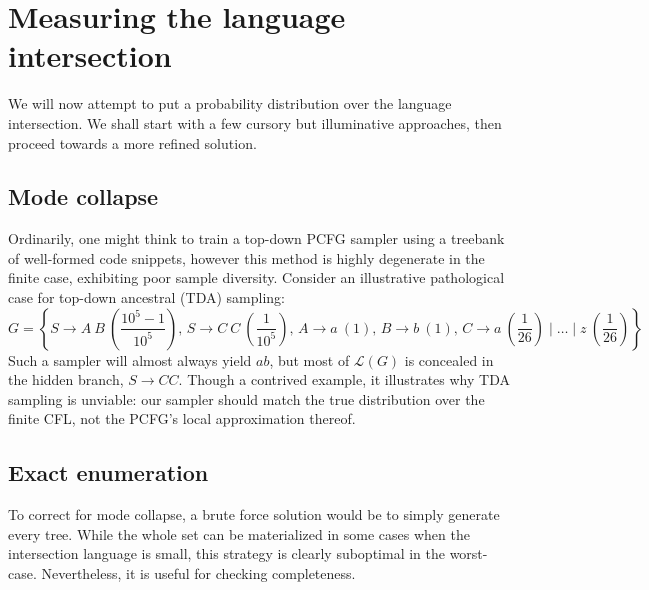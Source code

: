 \documentclass[sigplan,acmsmall,nonacm,screen]{acmart}\settopmatter{printfolios=false,printccs=false,printacmref=false}
\begin{document}
\clearpage

\section{Measuring the language intersection}\label{sec:measurement}

We will now attempt to put a probability distribution over the language intersection. We shall start with a few cursory but illuminative approaches, then proceed towards a more refined solution.

\subsection{Mode collapse}

Ordinarily, one might think to train a top-down PCFG sampler using a treebank of well-formed code snippets, however this method is highly degenerate in the finite case, exhibiting poor sample diversity. Consider an illustrative pathological case for top-down ancestral (TDA) sampling:
$$
G=\left\{ S \rightarrow A\:B \: \left(\frac{10^5 - 1}{10^5}\right), \hspace{2pt}
     S \rightarrow C\:C \: \left(\frac{1}{10^5}\right), \hspace{2pt}
     A \rightarrow a \: (1), \hspace{2pt}
     B  \rightarrow b \: (1), \hspace{2pt}
     C  \rightarrow a \: \left(\frac{1}{26}\right) \mid \ldots \mid z \: \left(\frac{1}{26}\right)\right\}
$$
Such a sampler will almost always yield $a b$, but most of $\mathcal{L}(G)$ is concealed in the hidden branch, $S \rightarrow C C$. Though a contrived example, it illustrates why TDA sampling is unviable: our sampler should match the true distribution over the finite CFL, not the PCFG's local approximation thereof.

\subsection{Exact enumeration}

To correct for mode collapse, a brute force solution would be to simply generate every tree. While the whole set can be materialized in some cases when the intersection language is small, this strategy is clearly suboptimal in the worst-case. Nevertheless, it is useful for checking completeness.
\end{document}

